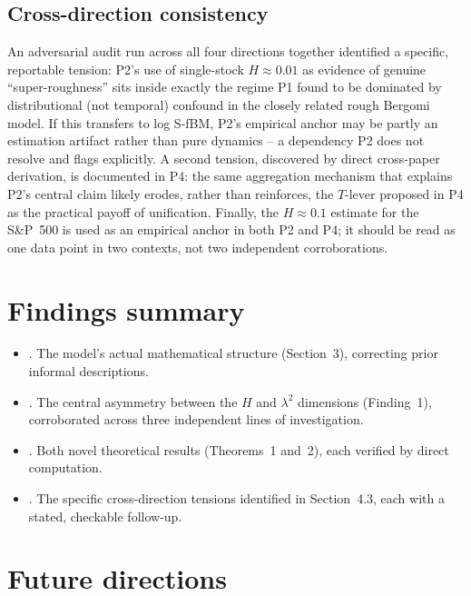 \documentclass[11pt]{article}
\begin{document}
\subsection{Cross-direction consistency}

An adversarial audit run across all four directions together identified a specific, reportable tension: P2's use of single-stock $H\approx0.01$ as evidence of genuine ``super-roughness'' sits inside exactly the regime P1 found to be dominated by distributional (not temporal) confound in the closely related rough Bergomi model. If this transfers to log S-fBM, P2's empirical anchor may be partly an estimation artifact rather than pure dynamics -- a dependency P2 does not resolve and flags explicitly. A second tension, discovered by direct cross-paper derivation, is documented in P4: the same aggregation mechanism that explains P2's central claim likely erodes, rather than reinforces, the $T$-lever proposed in P4 as the practical payoff of unification. Finally, the \citet{gatheral2018volatility} $H\approx0.1$ estimate for the S\&P~500 is used as an empirical anchor in both P2 and P4; it should be read as one data point in two contexts, not two independent corroborations.

\section{Findings summary}

\begin{itemize}
\item {}. The model's actual mathematical structure (Section~3), correcting prior informal descriptions.
\item {}. The central asymmetry between the $H$ and $\lambda^2$ dimensions (Finding~1), corroborated across three independent lines of investigation.
\item {}. Both novel theoretical results (Theorems~1 and~2), each verified by direct computation.
\item {}. The specific cross-direction tensions identified in Section~4.3, each with a stated, checkable follow-up.
\end{itemize}

\section{Future directions}
\end{document}
